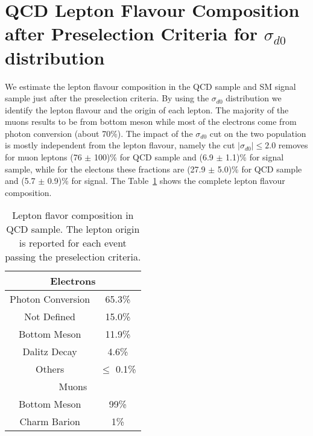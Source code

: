 \clearpage
\section{QCD Lepton Flavour Composition after Preselection Criteria for $\sigma_{d0}$ distribution}

We estimate the lepton flavour composition in the QCD sample and SM signal sample just after the preselection criteria.
By using the $\sigma_{d0}$ distribution we identify the lepton flavour and the origin of each lepton.
The majority of the muons results to be from bottom meson while most of the electrons come from photon conversion (about 70\%).
The impact of the $\sigma_{d0}$ cut on the two population is mostly independent from the lepton flavour, namely the cut
$|\sigma_{d0}| \le 2.0$ removes for muon leptons (76 $\pm$ 100)\% for QCD sample and (6.9 $\pm$ 1.1)\% for signal sample, while for the electons these fractions are (27.9 $\pm$ 5.0)\% for QCD sample and (5.7 $\pm$ 0.9)\% for signal.
The Table~\ref{tab:LepFlav} shows the complete lepton flavour composition.

\begin{table}[h!]
\centering
\begin{tabular}{|c|c|}
\hline\hline
\multicolumn{2}{c}{Electrons}\\\hline\hline
Photon Conversion  & 65.3\%  \\
Not Defined & 15.0\% \\
Bottom Meson & 11.9\% \\
Dalitz Decay &4.6\% \\
Others & $\le$ 0.1\% \\
\hline \hline
\multicolumn{2}{c}{Muons}\\\hline\hline
\hline \hline
Bottom Meson  & 99\% \\
Charm Barion  & 1\% \\
\hline\hline
\end{tabular}
\caption[Lepton flavor composition in QCD sample]{Lepton flavor composition in QCD sample. The lepton origin is reported for each event passing the preselection criteria. }
\label{tab:LepFlav}
\end{table}

